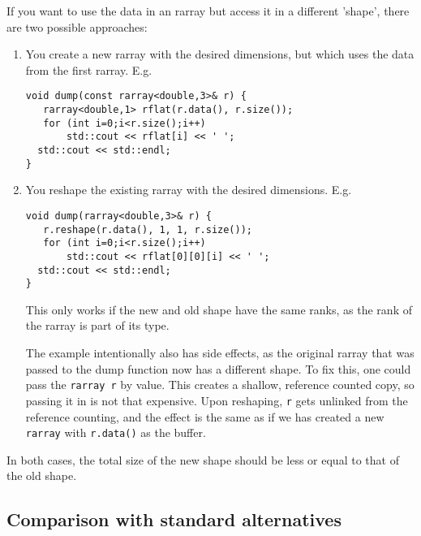 \documentclass[12pt,twoside]{article}
\begin{document}
If you want to use the data in an rarray but access it in a different 'shape', there are two possible approaches:
\begin{enumerate}
  \item You create a new rarray with the desired dimensions, but which uses the data from the first rarray. E.g.
\vspace{-9pt}
\begin{framed}\vspace{-18pt}%
\begin{verbatim}
void dump(const rarray<double,3>& r) {
   rarray<double,1> rflat(r.data(), r.size());
   for (int i=0;i<r.size();i++)
       std::cout << rflat[i] << ' ';
  std::cout << std::endl;
}
\end{verbatim}%
\vspace{-12pt}
\end{framed}\vspace{-8pt}
\item You reshape the existing rarray with the desired dimensions. E.g.
\vspace{-9pt}
\begin{framed}\vspace{-18pt}%
\begin{verbatim}
void dump(rarray<double,3>& r) {
   r.reshape(r.data(), 1, 1, r.size());
   for (int i=0;i<r.size();i++)
       std::cout << rflat[0][0][i] << ' ';
  std::cout << std::endl;
}
\end{verbatim}%
\vspace{-12pt}
\end{framed}\vspace{-8pt}
This only works if the new and old shape have the same ranks, as the rank of the rarray is part of its type. 

The example intentionally also has side effects, as the original rarray that was passed to the dump function now has a different shape.  To fix this, one could pass the \texttt{rarray r} by value. This creates a shallow, reference counted copy, so passing it in is not that expensive. Upon reshaping, \texttt{r} gets unlinked from the reference counting, and the effect is the same as if we has created a new \texttt{rarray} with \texttt{r.data()} as the buffer.
\end{enumerate}
In both cases, the total size of the new shape should be less or equal to that of the old shape. 

\subsection{Comparison with standard alternatives}
\end{document}
